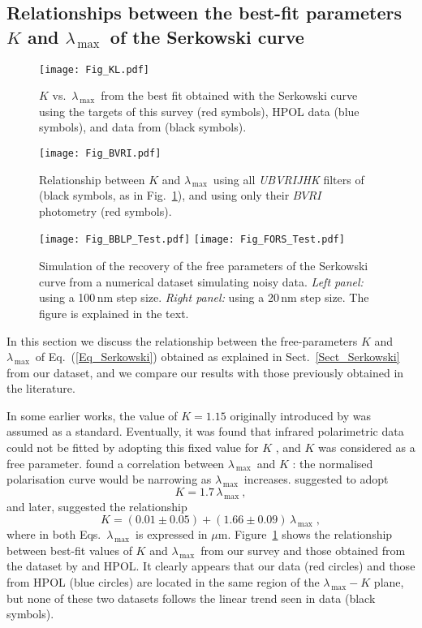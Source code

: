 \documentclass[a4paper]{aa}
\newcommand{\lmax}{\ensuremath{\lambda_\mathrm{\,max}}}
\begin{document}
\subsection{Relationships between the best-fit parameters $K$ and \lmax\ of the Serkowski curve}
\begin{figure}
  \texttt{[image: Fig\_KL.pdf]}
  \caption{\label{Fig_KL} $K$ vs.\ \lmax\ from the best fit obtained with the Serkowski curve using the targets
  of this survey (red symbols), HPOL data (blue symbols), and data from \citet{Whietal92} (black symbols).}
\end{figure}
\begin{figure}
  \texttt{[image: Fig\_BVRI.pdf]}
  \caption{\label{Fig_BVRI} Relationship between $K$ and \lmax\ using
    all {\it UBVRIJHK} filters of \citet{Whietal92} (black symbols,
    as in Fig.~\ref{Fig_KL}),
    and using only their $BVRI$ photometry (red symbols).}
\end{figure}
\begin{figure*}
  \texttt{[image: Fig\_BBLP\_Test.pdf]}
  \texttt{[image: Fig\_FORS\_Test.pdf]}
  \caption{\label{Fig_Test} Simulation of the recovery of the free parameters of the Serkowski curve
    from a numerical dataset simulating noisy data. {\it Left panel:}
    using a 100\,nm step size. {\it Right panel:} using a 20\,nm step size.
    The figure is explained in the text.}
\end{figure*}
In this section we discuss the relationship between the
free-parameters $K$ and \lmax\ of Eq.~(\ref{Eq_Serkowski}) obtained as
explained in Sect.~\ref{Sect_Serkowski} from our dataset, and we
compare our results with those previously obtained in the literature.

In some earlier works, the value of $K = 1.15$ originally introduced
by \citet{Serkowski73} was assumed as a standard. Eventually, it was
found that infrared polarimetric data could not be fitted by
adopting
this fixed value for $K$ \citep{DykJon78,Wiletal80}, and $K$ was
considered as a free parameter. \citet{Wiletal80} found a correlation
between \lmax\ and $K$ : the normalised polarisation curve
would be narrowing as \lmax\ increases. \citet{Wiletal80} suggested to
adopt
\[
K=1.7\,\lmax\ ,
\]
and later, \citet{Whietal92} suggested the relationship
\begin{equation}
K = (0.01 \pm 0.05) + (1.66 \pm 0.09)\, \lmax \; ,
\label{Eq_Whittet}
\end{equation}
where in both Eqs.\ \lmax\ is expressed in $\mu$m.
Figure~\ref{Fig_KL} shows the relationship between best-fit values of
$K$ and \lmax\ from our survey and those obtained from the
dataset by \citet{Whietal92} and HPOL. It clearly appears that
our data (red circles) and those from HPOL (blue circles) are located
in the same region of the $\lmax-K$ plane, but none of these two datasets
follows the linear trend seen in \citet{Whietal92} data (black symbols).
\end{document}

